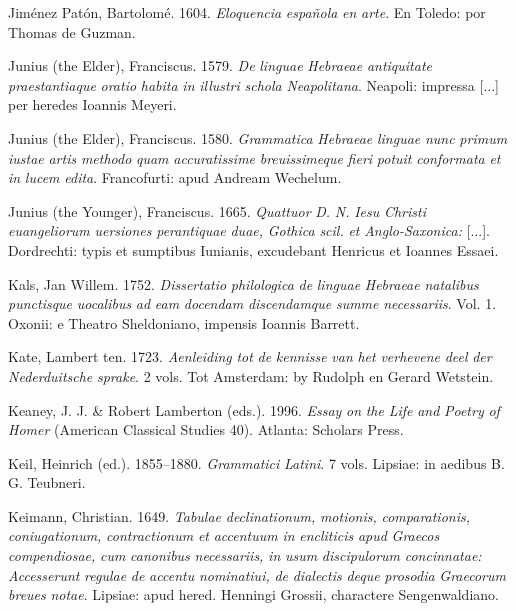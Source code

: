 \documentclass[output=paper]{langsci/langscibook}
\begin{document}
Jiménez Patón, Bartolomé. 1604. \textit{Eloquencia} \textit{española} \textit{en} \textit{arte}. En Toledo: por Thomas de Guzman.

Junius (the Elder), Franciscus. 1579. \textit{De} \textit{linguae} \textit{Hebraeae} \textit{antiquitate} \textit{praestantiaque} \textit{oratio} \textit{habita} \textit{in} \textit{illustri} \textit{schola} \textit{Neapolitana}. Neapoli: impressa [...] per heredes Ioannis Meyeri.

Junius (the Elder), Franciscus. 1580. \textit{Grammatica} \textit{Hebraeae} \textit{linguae} \textit{nunc} \textit{primum} \textit{iustae} \textit{artis} \textit{methodo} \textit{quam} \textit{accuratissime} \textit{breuissimeque} \textit{fieri} \textit{potuit} \textit{conformata} \textit{et} \textit{in} \textit{lucem} \textit{edita}. Francofurti: apud Andream Wechelum.

Junius (the Younger), Franciscus. 1665. \textit{Quattuor} \textit{D.} \textit{N.} \textit{Iesu} \textit{Christi} \textit{euangeliorum} \textit{uersiones} \textit{perantiquae} \textit{duae,} \textit{Gothica} \textit{scil.} \textit{et} \textit{Anglo-Saxonica:} [...]. Dordrechti: typis et sumptibus Iunianis, excudebant Henricus et Ioannes Essaei.

Kals, Jan Willem. 1752. \textit{Dissertatio} \textit{philologica} \textit{de} \textit{linguae} \textit{Hebraeae} \textit{natalibus} \textit{punctisque} \textit{uocalibus} \textit{ad} \textit{eam} \textit{docendam} \textit{discendamque} \textit{summe} \textit{necessariis}. Vol. 1. Oxonii: e Theatro Sheldoniano, impensis Ioannis Barrett.

Kate, Lambert ten. 1723. \textit{Aenleiding} \textit{tot} \textit{de} \textit{kennisse} \textit{van} \textit{het} \textit{verhevene} \textit{deel} \textit{der} \textit{Nederduitsche} \textit{sprake}. 2 vols. Tot Amsterdam: by Rudolph en Gerard Wetstein.

Keaney, J. J. \& Robert Lamberton (eds.). 1996. \textit{Essay} \textit{on} \textit{the} \textit{Life} \textit{and} \textit{Poetry} \textit{of} \textit{Homer} (American Classical Studies 40). Atlanta: Scholars Press.

Keil, Heinrich (ed.). 1855–1880. \textit{Grammatici} \textit{Latini}. 7 vols. Lipsiae: in aedibus B. G. Teubneri.

Keimann, Christian. 1649. \textit{Tabulae} \textit{declinationum,} \textit{motionis,} \textit{comparationis,} \textit{coniugationum,} \textit{contractionum} \textit{et} \textit{accentuum} \textit{in} \textit{encliticis} \textit{apud} \textit{Graecos} \textit{compendiosae,} \textit{cum} \textit{canonibus} \textit{necessariis,} \textit{in} \textit{usum} \textit{discipulorum} \textit{concinnatae:} \textit{Accesserunt} \textit{regulae} \textit{de} \textit{accentu} \textit{nominatiui,} \textit{de} \textit{dialectis} \textit{deque} \textit{prosodia} \textit{Graecorum} \textit{breues} \textit{notae}. Lipsiae: apud hered. Henningi Grossii, charactere Sengenwaldiano.
\end{document}
